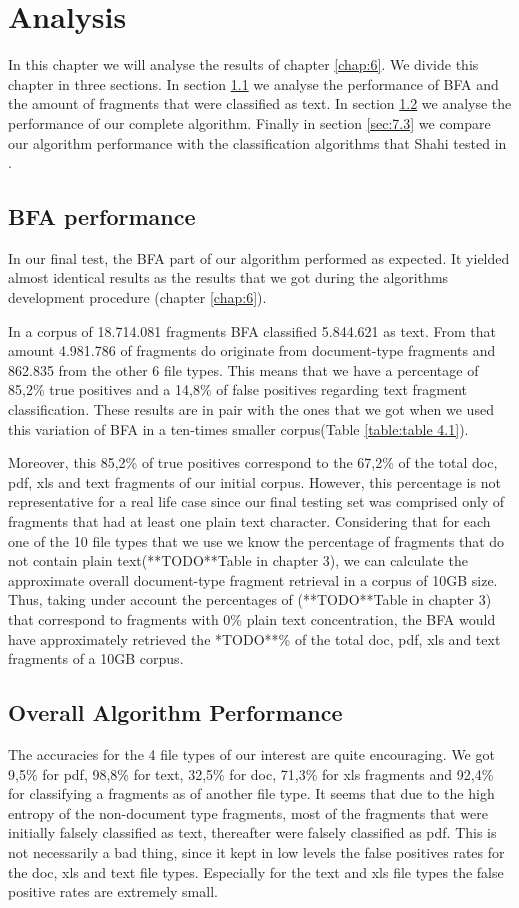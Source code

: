 \chapter{Analysis}
In this chapter we will analyse the results of chapter \ref{chap:6}. We divide this chapter in three sections. In section \ref{sec:7.1} we analyse the performance of BFA and the amount of fragments that were classified as text. In section  \ref{sec:7.2} we analyse the performance of our complete algorithm. Finally in section  \ref{sec:7.3} we compare our algorithm performance with the classification algorithms that Shahi tested in \cite{Shahi}.

\section{BFA performance}\label{sec:7.1}
In our final test, the BFA part of our algorithm performed as expected. It yielded almost identical results as the results that we got during the algorithms development procedure (chapter \ref{chap:6}).

In a corpus of 18.714.081 fragments BFA classified 5.844.621 as text. From that amount 4.981.786 of fragments do originate from document-type fragments and 862.835 from the other 6 file types. This means that we have a percentage of 85,2\% true positives and a 14,8\% of false positives regarding text fragment classification. These results are in pair with the ones that we got when we used this variation of BFA in a ten-times smaller corpus(Table \ref{table:table 4.1}).

Moreover, this 85,2\% of true positives correspond to the 67,2\% of the total doc, pdf, xls and text fragments of our initial corpus. However, this percentage is not representative for a real life case since our final testing set was comprised only of fragments that had at least one plain text character. Considering that for each one of the 10 file types that we use we know the percentage of fragments that do not contain plain text(**TODO**Table in chapter 3), we can calculate the approximate overall document-type fragment retrieval in a corpus of 10GB size. Thus, taking under account the percentages of (**TODO**Table in chapter 3) that correspond to fragments with 0\% plain text concentration, the BFA would have approximately retrieved the *TODO**\% of the total doc, pdf, xls and text fragments of a 10GB corpus.

\section{Overall Algorithm Performance}\label{sec:7.2}
The accuracies for the 4 file types of our interest are quite encouraging. We got 9,5\% for pdf, 98,8\% for text, 32,5\% for doc, 71,3\% for xls fragments and 92,4\% for classifying a fragments as of another file type. It seems that due to the high entropy of the non-document type fragments, most of the fragments that were initially falsely classified as text, thereafter were falsely classified as pdf. This is not necessarily a bad thing, since it kept in low levels the false positives rates for the doc, xls and text file types. Especially for the text and xls file types the false positive rates are extremely small.

